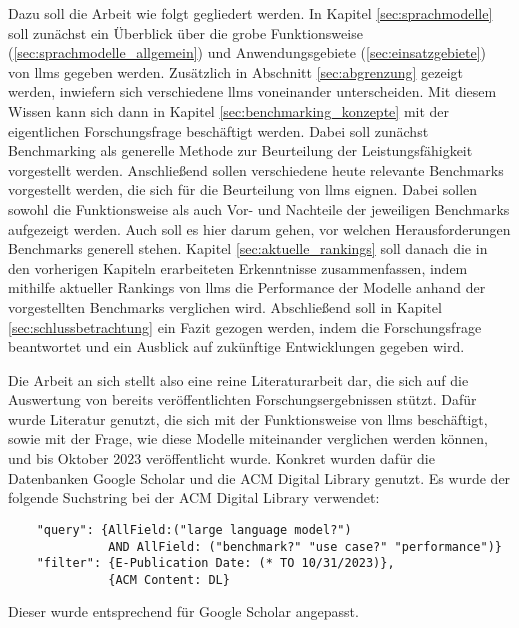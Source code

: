 Dazu soll die Arbeit wie folgt gegliedert werden.
In Kapitel \ref{sec:sprachmodelle} soll zunächst ein Überblick über die grobe Funktionsweise (\ref{sec:sprachmodelle_allgemein}) und Anwendungsgebiete (\ref{sec:einsatzgebiete}) von \acp{llm} gegeben werden. Zusätzlich in Abschnitt \ref{sec:abgrenzung} gezeigt werden, inwiefern sich verschiedene \acp{llm} voneinander unterscheiden.
Mit diesem Wissen kann sich dann in Kapitel \ref{sec:benchmarking_konzepte} mit der eigentlichen Forschungsfrage beschäftigt werden.
Dabei soll zunächst Benchmarking als generelle Methode zur Beurteilung der Leistungsfähigkeit vorgestellt werden.
Anschließend sollen verschiedene heute relevante Benchmarks vorgestellt werden, die sich für die Beurteilung von \acp{llm} eignen.
Dabei sollen sowohl die Funktionsweise als auch Vor- und Nachteile der jeweiligen Benchmarks aufgezeigt werden.
Auch soll es hier darum gehen, vor welchen Herausforderungen Benchmarks generell stehen.
Kapitel \ref{sec:aktuelle_rankings} soll danach die in den vorherigen Kapiteln erarbeiteten Erkenntnisse zusammenfassen, indem mithilfe aktueller Rankings von \acp{llm} die Performance der Modelle anhand der vorgestellten Benchmarks verglichen wird.
Abschließend soll in Kapitel \ref{sec:schlussbetrachtung} ein Fazit gezogen werden, indem die Forschungsfrage beantwortet und ein Ausblick auf zukünftige Entwicklungen gegeben wird.

Die Arbeit an sich stellt also eine reine Literaturarbeit dar, die sich auf die Auswertung von bereits veröffentlichten Forschungsergebnissen stützt.
Dafür wurde Literatur genutzt, die sich mit der Funktionsweise von \acp{llm} beschäftigt, sowie mit der Frage, wie diese Modelle miteinander verglichen werden können, und bis Oktober 2023 veröffentlicht wurde.
Konkret wurden dafür die Datenbanken Google Scholar und die ACM Digital Library genutzt.
Es wurde der folgende Suchstring bei der ACM Digital Library verwendet:
\begin{verbatim}
    "query": {AllField:("large language model?") 
              AND AllField: ("benchmark?" "use case?" "performance")} 
    "filter": {E-Publication Date: (* TO 10/31/2023)},
              {ACM Content: DL}
\end{verbatim}
Dieser wurde entsprechend für Google Scholar angepasst.
